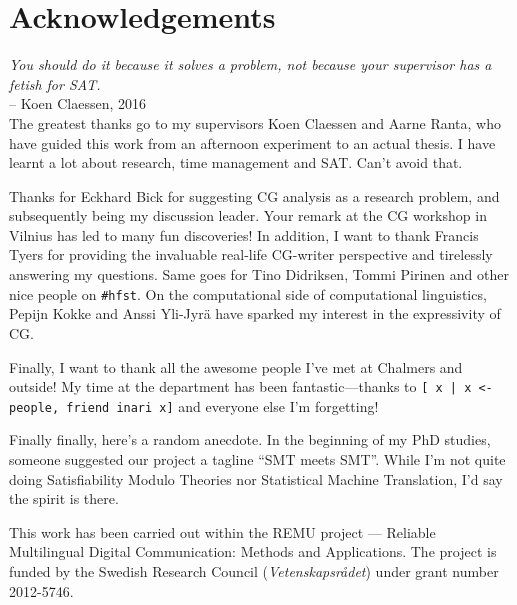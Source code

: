 \chapter*{Acknowledgements}\label{chp:acknowledgements}


\emph{You should do it because it solves a problem, not because your supervisor has a fetish for SAT.} \\
-- Koen Claessen, 2016 \\


The greatest thanks go to my supervisors Koen Claessen and Aarne Ranta, 
who have guided this work from an afternoon experiment 
to an actual thesis. I have learnt a lot about research, time management and SAT. Can't avoid that.


Thanks for Eckhard Bick for suggesting CG analysis as a research
problem, and subsequently being my discussion leader. 
Your remark at the CG workshop in Vilnius has led to many fun discoveries!
In addition, I want to thank Francis Tyers for providing the invaluable real-life CG-writer perspective and tirelessly answering my questions. Same goes for Tino Didriksen, Tommi Pirinen and other nice people on \texttt{\#hfst}. 
On the computational side of computational linguistics, 
Pepijn Kokke and Anssi Yli-Jyrä have sparked my interest in the expressivity of CG.


Finally, I want to thank all the awesome people I've met at Chalmers and outside! 
My time at the department has been fantastic---thanks to 
\texttt{[ x | x <- people, friend inari x]}  and everyone else I'm forgetting! 








Finally finally, here's a random anecdote. 
In the beginning of my PhD studies, someone suggested our project 
a tagline ``SMT meets SMT''. While I'm not quite doing Satisfiability
Modulo Theories nor Statistical Machine Translation, I'd say the spirit is there.






\vfill\noindent
This work has been carried out within the REMU project — Reliable Multilingual Digital Communication: Methods and Applications.
The project is funded by the Swedish Research Council (\emph{Vetenskapsrådet}) under grant number 2012-5746.
